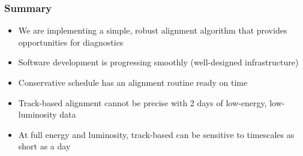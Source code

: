 \documentclass[compress]{beamer}
\begin{document}
\begin{frame}
\frametitle{Summary}

\begin{itemize}\setlength{\itemsep}{0.35 cm}
\item We are implementing a simple, robust alignment algorithm that
provides opportunities for diagnostics

\item Software development is progressing smoothly (well-designed
infrastructure)

\item Conservative schedule has an alignment routine ready on time

\item Track-based alignment cannot be precise with 2 days of
low-energy, low-luminosity data

\item At full energy and luminosity, track-based can be sensitive to
timescales as short as a day
\end{itemize}

\label{numpages}
\end{frame}
\end{document}
